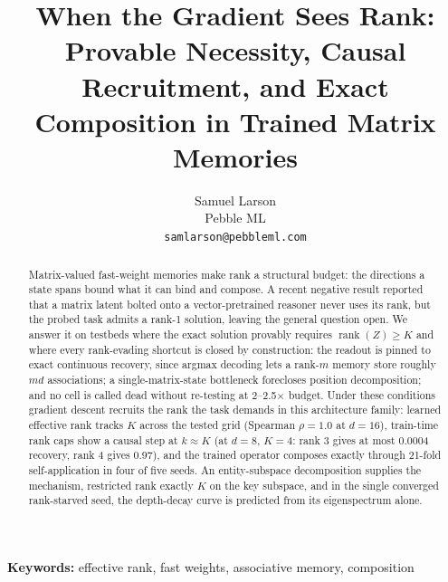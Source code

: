 \documentclass{article}
\title{When the Gradient Sees Rank: Provable
Necessity, Causal Recruitment, and Exact Composition in Trained Matrix
Memories}
\author{%
  Samuel Larson\\
  Pebble ML\\
  \texttt{samlarson@pebbleml.com}%
}
\theoremstyle{plain}
\newcommand{\rank}{\operatorname{rank}}
\begin{document}
\maketitle

\begin{abstract}
Matrix-valued fast-weight memories make rank a structural budget: the
directions a state spans bound what it can bind and compose. A recent
negative result reported that a matrix latent bolted onto a
vector-pretrained reasoner never uses its rank, but the probed task admits
a rank-1 solution, leaving the general question open. We answer it on
testbeds where the exact solution provably requires
$\rank(Z) \geq K$ and where every rank-evading shortcut is closed by
construction: the readout is pinned to exact continuous recovery, since
argmax decoding lets a rank-$m$ memory store roughly $md$ associations; a
single-matrix-state bottleneck forecloses position decomposition; and no
cell is called dead without re-testing at 2--2.5$\times$ budget. Under
these conditions gradient descent recruits the rank the task demands in
this architecture family:
learned effective rank tracks $K$ across the tested grid (Spearman
$\rho = 1.0$ at $d = 16$),
train-time rank caps show a causal step at $k \approx K$ (at $d = 8$,
$K = 4$: rank 3 gives at most 0.0004 recovery, rank 4 gives 0.97),
and the trained operator composes exactly through 21-fold self-application
in four of five seeds.
An entity-subspace decomposition supplies the mechanism, restricted rank
exactly $K$ on the key subspace,
and in the single converged rank-starved seed, the depth-decay curve is
predicted from its eigenspectrum alone.
\end{abstract}

\noindent\textbf{Keywords:} effective rank, fast weights, associative
memory, composition












\end{document}

